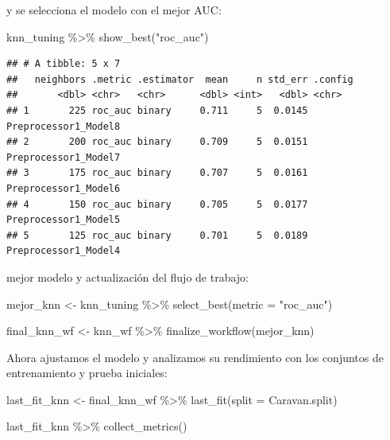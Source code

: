 \documentclass[
  12pt,
]{book}
\newenvironment{Shaded}{\begin{snugshade}}{\end{snugshade}}
\newcommand{\AttributeTok}[1]{\textcolor[rgb]{0.77,0.63,0.00}{#1}}
\newcommand{\FunctionTok}[1]{\textcolor[rgb]{0.00,0.00,0.00}{#1}}
\newcommand{\NormalTok}[1]{#1}
\newcommand{\OtherTok}[1]{\textcolor[rgb]{0.56,0.35,0.01}{#1}}
\newcommand{\SpecialCharTok}[1]{\textcolor[rgb]{0.00,0.00,0.00}{#1}}
\newcommand{\StringTok}[1]{\textcolor[rgb]{0.31,0.60,0.02}{#1}}
\theoremstyle{definition}
\theoremstyle{definition}
\theoremstyle{definition}
\theoremstyle{definition}
\theoremstyle{remark}
\begin{document}
y se selecciona el modelo con el mejor AUC:

\begin{Shaded}
\begin{Highlighting}[]
\NormalTok{knn\_tuning }\SpecialCharTok{\%\textgreater{}\%}
    \FunctionTok{show\_best}\NormalTok{(}\StringTok{"roc\_auc"}\NormalTok{)}
\end{Highlighting}
\end{Shaded}

\begin{verbatim}
## # A tibble: 5 x 7
##   neighbors .metric .estimator  mean     n std_err .config             
##       <dbl> <chr>   <chr>      <dbl> <int>   <dbl> <chr>               
## 1       225 roc_auc binary     0.711     5  0.0145 Preprocessor1_Model8
## 2       200 roc_auc binary     0.709     5  0.0151 Preprocessor1_Model7
## 3       175 roc_auc binary     0.707     5  0.0161 Preprocessor1_Model6
## 4       150 roc_auc binary     0.705     5  0.0177 Preprocessor1_Model5
## 5       125 roc_auc binary     0.701     5  0.0189 Preprocessor1_Model4
\end{verbatim}

mejor modelo y actualización del flujo de trabajo:

\begin{Shaded}
\begin{Highlighting}[]
\NormalTok{mejor\_knn }\OtherTok{\textless{}{-}}\NormalTok{ knn\_tuning }\SpecialCharTok{\%\textgreater{}\%}
    \FunctionTok{select\_best}\NormalTok{(}\AttributeTok{metric =} \StringTok{"roc\_auc"}\NormalTok{)}

\NormalTok{final\_knn\_wf }\OtherTok{\textless{}{-}}\NormalTok{ knn\_wf }\SpecialCharTok{\%\textgreater{}\%}
    \FunctionTok{finalize\_workflow}\NormalTok{(mejor\_knn)}
\end{Highlighting}
\end{Shaded}

Ahora ajustamos el modelo y analizamos su rendimiento con los conjuntos de entrenamiento y prueba iniciales:

\begin{Shaded}
\begin{Highlighting}[]
\NormalTok{last\_fit\_knn }\OtherTok{\textless{}{-}}\NormalTok{ final\_knn\_wf }\SpecialCharTok{\%\textgreater{}\%}
    \FunctionTok{last\_fit}\NormalTok{(}\AttributeTok{split =}\NormalTok{ Caravan.split)}

\NormalTok{last\_fit\_knn }\SpecialCharTok{\%\textgreater{}\%}
    \FunctionTok{collect\_metrics}\NormalTok{()}
\end{Highlighting}
\end{Shaded}
\end{document}
